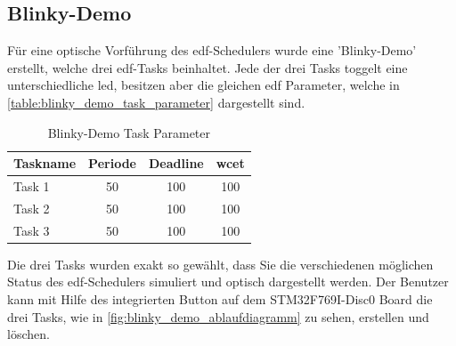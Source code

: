 \documentclass[../EDF Master Thesis.tex]{subfiles}
\begin{document}
    \clearpage
    \subsection{Blinky-Demo} \label{section:blinky_demo}
        Für eine optische Vorführung des \ac{edf}-Schedulers wurde eine 'Blinky-Demo' erstellt, welche drei \ac{edf}-Tasks beinhaltet.
        Jede der drei Tasks toggelt eine unterschiedliche \ac{led}, besitzen aber die gleichen \ac{edf} Parameter, welche in \autoref{table:blinky_demo_task_parameter} dargestellt sind.

        \begin{table}[ht!]
            \centering
            \begin{tabular}{l|c|c|c}
                Taskname & Periode & Deadline & \ac{wcet} \\
                \hline
                Task 1 & 50 & 100 & 100\\
                Task 2 & 50 & 100 & 100\\
                Task 3 & 50 & 100 & 100\\
            \end{tabular}
            \caption{Blinky-Demo Task Parameter}
            \label{table:blinky_demo_task_parameter}
        \end{table}

        Die drei Tasks wurden exakt so gewählt, dass Sie die verschiedenen möglichen Status des \ac{edf}-Schedulers simuliert und optisch dargestellt werden.
        Der Benutzer kann mit Hilfe des integrierten Button auf dem STM32F769I-Disc0 Board die drei Tasks, wie in \autoref{fig:blinky_demo_ablaufdiagramm} zu sehen, erstellen und löschen.
        
\end{document}
